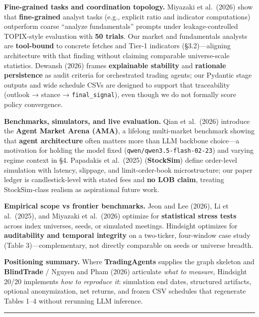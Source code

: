 \documentclass[
]{article}
\begin{document}
\textbf{Fine-grained tasks and coordination topology.} Miyazaki et
al.~(2026) show that \textbf{fine-grained} analyst tasks (e.g., explicit
ratio and indicator computations) outperform coarse ``analyze
fundamentals'' prompts under leakage-controlled TOPIX-style evaluation
with \textbf{50 trials}. Our market and fundamentals analysts are
\textbf{tool-bound} to concrete fetches and Tier-1 indicators
(§3.2)---aligning architecture with that finding without claiming
comparable universe-scale statistics. Dewansh (2026) frames
\textbf{explainable stability} and \textbf{rationale persistence} as
audit criteria for orchestrated trading agents; our Pydantic stage
outputs and wide schedule CSVs are designed to support that traceability
(outlook → stance → \texttt{final\_signal}), even though we do not
formally score policy convergence.

\textbf{Benchmarks, simulators, and live evaluation.} Qian et al.~(2026)
introduce the \textbf{Agent Market Arena (AMA)}, a lifelong multi-market
benchmark showing that \textbf{agent architecture} often matters more
than LLM backbone choice---a motivation for holding the model fixed
(\texttt{qwen/qwen3.5-flash-02-23}) and varying regime context in §4.
Papadakis et al.~(2025) (\textbf{StockSim}) define order-level
simulation with latency, slippage, and limit-order-book microstructure;
our paper ledger is candlestick-level with stated fees and \textbf{no
LOB claim}, treating StockSim-class realism as aspirational future work.

\textbf{Empirical scope vs frontier benchmarks.} Jeon and Lee (2026), Li
et al.~(2025), and Miyazaki et al.~(2026) optimize for
\textbf{statistical stress tests} across index universes, seeds, or
simulated meetings. Hindsight optimizes for \textbf{auditability and
temporal integrity} on a two-ticker, four-window case study (Table
3)---complementary, not directly comparable on seeds or universe
breadth.

\textbf{Positioning summary.} Where \textbf{TradingAgents} supplies the
graph skeleton and \textbf{BlindTrade} / Nguyen and Pham (2026)
articulate \emph{what to measure}, Hindsight 20/20 implements \emph{how
to reproduce it}: simulation end dates, structured artifacts, optional
anonymization, net returns, and frozen CSV schedules that regenerate
Tables 1--4 without rerunning LLM inference.

\begin{center}\rule{0.5\linewidth}{0.5pt}\end{center}
\end{document}
